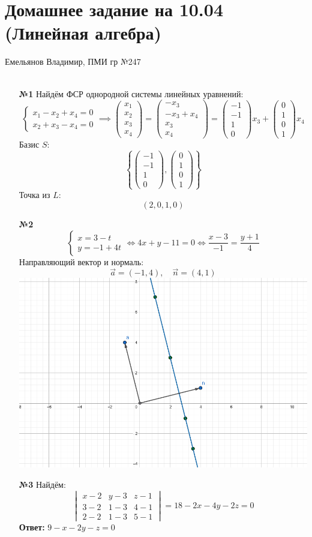 \documentclass[a4paper]{article}
\newcommand{\mat}[1]{\begin{pmatrix} #1 \end{pmatrix}}
\newcommand{\vmat}[1]{\begin{vmatrix} #1 \end{vmatrix}}
\renewcommand{\f}[2]{\frac{#1}{#2}}
\newcommand{\case}[1]{\begin{cases} #1 \end{cases}}
\newcommand{\lr}{\Leftrightarrow}
\begin{document}
\section*{Домашнее задание на 10.04 (Линейная алгебра)}
 {\large Емельянов Владимир, ПМИ гр №247}\\\\
\begin{enumerate}
    \item[\textbf{№1}]Найдём ФСР однородной системы линейных уравнений:
    $$\case{
        x_1 - x_2 + x_4 = 0\\
        x_2 + x_3 - x_4 = 0
    }\implies \mat{x_1\\x_2\\x_3\\x_4} = \mat{-x_3\\-x_3+x_4\\x_3\\x_4} = \mat{-1\\-1\\1\\0}x_3 + \mat{0\\1\\0\\1}x_4$$
    Базис $S$:
    $$\left\{\mat{-1\\-1\\1\\0},  \mat{0\\1\\0\\1}\right\}$$
    Точка из $L$:
    $$(2, 0, 1, 0)$$


    \item[\textbf{№2}]$$\case{x = 3-t\\y=-1+4t} \lr 4x + y -11=0 \lr \f{x-3}{-1}=\f{y+1}{4}$$
    Направляющий вектор и нормаль:
    $$\vec{a} = (-1, 4), \quad \vec{n} = (4, 1)$$
    \includegraphics[scale=0.6]{image.png}\\

    \item[\textbf{№3}]Найдём:
    $$\vmat{x-2 & y-3 & z- 1 \\ 3 -2 & 1 - 3 & 4 - 1\\ 2 -2 & 1-3 & 5-1} = 18 - 2x - 4y - 2z = 0$$
    \textbf{Ответ:} $9 - x - 2y - z=0$
\end{enumerate}
\end{document}
